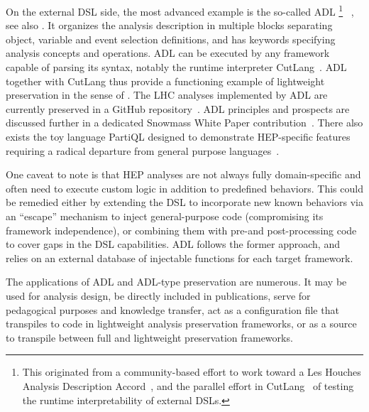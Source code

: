 \documentclass[11pt]{article}
\begin{document}
On the external \gls{DSL} side, the most advanced example is the so-called \gls{ADL}%
\footnote{This originated from a community-based effort to work toward a Les Houches Analysis Description Accord~\cite{Brooijmans:2016vro}, and the parallel effort in CutLang~\cite{Sekmen:2018ehb} of testing the runtime interpretability of external \glspl{DSL}.}
~\cite{adlweb, Unel:2021edl}, see also \cite{LHCReinterpretationForum:2020xtr}. 
It organizes the analysis description in multiple blocks separating object, variable and event selection definitions, and has keywords specifying analysis concepts and operations. 
\gls{ADL} can be executed by any framework capable of parsing its syntax, notably the runtime interpreter CutLang~\cite{Sekmen:2018ehb}. \gls{ADL} together with CutLang thus provide a functioning example of lightweight preservation in the sense of . 
The \gls{LHC} analyses implemented by \gls{ADL} are currently preserved in a GitHub repository~\cite{adllhcanl}.  \gls{ADL} principles and prospects are discussed further in a dedicated Snowmass White Paper contribution~\cite{snowmass:ADL}.  There also exists the toy language PartiQL designed to demonstrate HEP-specific features requiring a radical departure from general purpose languages~\cite{PartiQL}. 

One caveat to note is that \gls{HEP} analyses are not always fully domain-specific and often need to execute custom logic in addition to predefined behaviors.
This could be remedied either by extending the \gls{DSL} to incorporate new known behaviors via an ``escape'' mechanism to inject general-purpose code (compromising its framework independence), or combining them with pre-and post-processing code to cover gaps in the \gls{DSL} capabilities.
\gls{ADL}  follows the former approach, and relies on an external database of injectable functions for each target framework.

The applications of \gls{ADL} and \gls{ADL}-type preservation are numerous. It may be used for analysis design, be directly included in publications, serve for pedagogical purposes and knowledge transfer, 
act as a configuration file that transpiles to code in lightweight analysis preservation frameworks, or
as a source to transpile between full and lightweight preservation frameworks.
\end{document}
